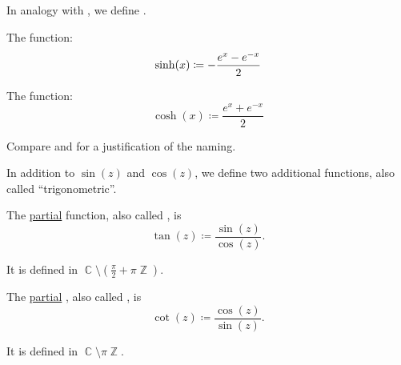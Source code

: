 \begin{definition}\label{def:hyperbolic_trigonometric_functions}
  In analogy with , we define .

  \begin{thmenum}
     The  function:
    \begin{equation*}
      \sinh(x) \coloneqq - \frac {e^x - e^{-x}} 2 \\
    \end{equation*}

     The  function:
    \begin{equation*}
      \cosh(x) \coloneqq \frac {e^x + e^{-x}} 2
    \end{equation*}
  \end{thmenum}

  Compare  and  for a justification of the naming.
\end{definition}

\begin{definition}\label{def:derived_trigonometric_functions}
  In addition to \( \sin(z) \) and \( \cos(z) \), we define two additional functions, also called \enquote{trigonometric}.

  \begin{thmenum}
     The \hyperref[def:partial_function]{partial}  function, also called , is
    \begin{equation*}
      \tan(z) \coloneqq \frac {\sin(z)} {\cos(z)}.
    \end{equation*}

    It is defined in \( \BbbC \setminus (\tfrac \pi 2 + \pi\BbbZ) \).

     The \hyperref[def:partial_function]{partial} , also called , is
    \begin{equation*}
      \cot(z) \coloneqq \frac {\cos(z)} {\sin(z)}.
    \end{equation*}

    It is defined in \( \BbbC \setminus \pi\BbbZ \).
  \end{thmenum}
\end{definition}

